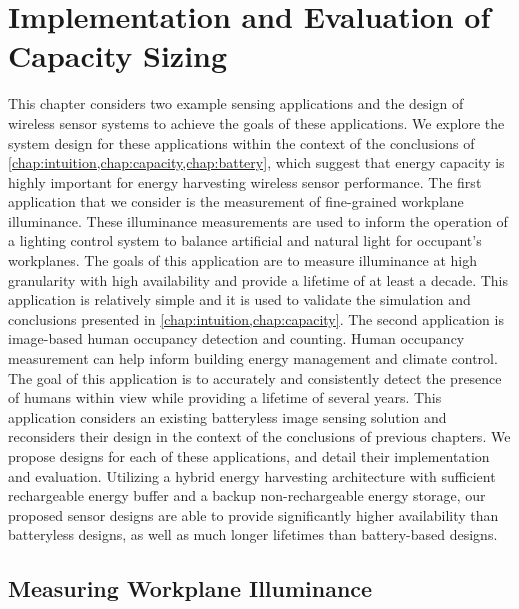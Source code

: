\chapter{Implementation and Evaluation of Capacity Sizing}
\label{chap:impl}

This chapter considers two example sensing applications and the design of wireless sensor systems to achieve the goals of these applications.
We explore the system design for these applications within the context of the conclusions of \cref{chap:intuition,chap:capacity,chap:battery}, which suggest that energy capacity is highly important for energy harvesting wireless sensor performance.
The first application that we consider is the measurement of fine-grained workplane illuminance. These illuminance measurements are used to inform the operation of a lighting control system to balance artificial and natural light for occupant's workplanes. 
The goals of this application are to measure illuminance at high granularity with high availability and provide a lifetime of at least a decade. 
This application is relatively simple and it is used to validate the simulation and conclusions presented in \cref{chap:intuition,chap:capacity}.
The second application is image-based human occupancy detection and counting. 
Human occupancy measurement can help inform building energy management and climate control.
The goal of this application is to accurately and consistently detect the presence of humans within view while providing a lifetime of several years.
This application considers an existing batteryless image sensing solution and reconsiders their design in the context of the conclusions of previous chapters.
We propose designs for each of these applications, and detail their implementation and evaluation.
Utilizing a hybrid energy harvesting architecture with sufficient rechargeable energy buffer and a backup non-rechargeable energy storage, our proposed sensor designs are able to provide significantly higher availability than batteryless designs, as well as much longer lifetimes than battery-based designs. 

\section{Measuring Workplane Illuminance}
\label{sec:impl:permamote}



